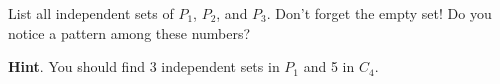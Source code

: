 \documentclass{book}
\begin{document}
\setcounter{cpjt}{132}
\addtocounter{cpjt}{-1}
\begin{activity}\label{activity-125}
\hypertarget{p-884}{}%
List all independent sets of \(P_1\), \(P_2\), and \(P_3\).  Don't forget the empty set! Do you notice a pattern among these numbers?%
\par\smallskip%
\noindent\textbf{Hint}.\hypertarget{hint-90}{}\quad%
\hypertarget{p-885}{}%
You should find 3 independent sets in \(P_1\) and 5 in \(C_4\).%
\end{activity}

\clearpage
\end{document}
